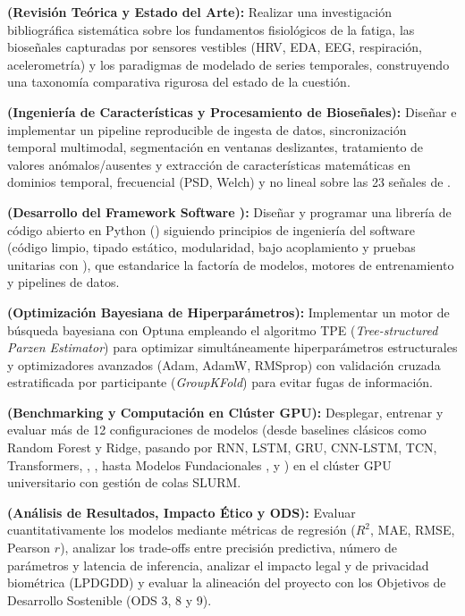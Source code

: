 \begin{description}[font=\bfseries, leftmargin=1.4cm]
    \item[OE1] \textbf{(Revisión Teórica y Estado del Arte):} Realizar una investigación bibliográfica sistemática sobre los fundamentos fisiológicos de la fatiga, las bioseñales capturadas por sensores vestibles (HRV, EDA, EEG, respiración, acelerometría) y los paradigmas de modelado de series temporales, construyendo una taxonomía comparativa rigurosa del estado de la cuestión.
    \item[OE2] \textbf{(Ingeniería de Características y Procesamiento de Bioseñales):} Diseñar e implementar un pipeline reproducible de ingesta de datos, sincronización temporal multimodal, segmentación en ventanas deslizantes, tratamiento de valores anómalos/ausentes y extracción de características matemáticas en dominios temporal, frecuencial (PSD, Welch) y no lineal sobre las 23 señales de \fatigueset{}.
    \item[OE3] \textbf{(Desarrollo del Framework Software ):} Diseñar y programar una librería de código abierto en Python () siguiendo principios de ingeniería del software (código limpio, tipado estático, modularidad, bajo acoplamiento y pruebas unitarias con ), que estandarice la factoría de modelos, motores de entrenamiento y pipelines de datos.
    \item[OE4] \textbf{(Optimización Bayesiana de Hiperparámetros):} Implementar un motor de búsqueda bayesiana con Optuna empleando el algoritmo TPE (\textit{Tree-structured Parzen Estimator}) para optimizar simultáneamente hiperparámetros estructurales y optimizadores avanzados (Adam, AdamW, RMSprop) con validación cruzada estratificada por participante (\textit{GroupKFold}) para evitar fugas de información.
    \item[OE5] \textbf{(Benchmarking y Computación en Clúster GPU):} Desplegar, entrenar y evaluar más de 12 configuraciones de modelos (desde baselines clásicos como Random Forest y Ridge, pasando por RNN, LSTM, GRU, CNN-LSTM, TCN, Transformers, \patchtst{}, \xlstm{}, hasta Modelos Fundacionales \moment{}, \chronos{} y \timesfm{}) en el clúster GPU universitario con gestión de colas SLURM.
    \item[OE6] \textbf{(Análisis de Resultados, Impacto Ético y ODS):} Evaluar cuantitativamente los modelos mediante métricas de regresión ($R^2$, MAE, RMSE, Pearson $r$), analizar los trade-offs entre precisión predictiva, número de parámetros y latencia de inferencia, analizar el impacto legal y de privacidad biométrica (LPDGDD) y evaluar la alineación del proyecto con los Objetivos de Desarrollo Sostenible (ODS 3, 8 y 9).
\end{description}

